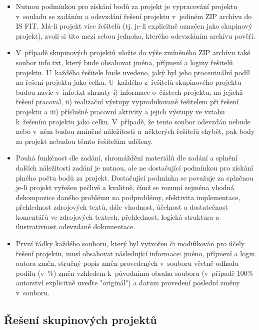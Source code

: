 \documentclass[11pt, a4paper, titlepage]{article}
\begin{document}
\begin{itemize}
    \item Nutnou podmínkou pro získání bodů za projekt je vypracování projektu v~souladu se zadáním a odevzdání řešení projektu v~jediném ZIP archívu do IS FIT. Má-li projekt více řešitelů (tj. je-li explicitně označen jako skupinový projekt), zvolí si tito mezi sebou jednoho, kterého odevzdáním archívu pověří.
    \item V~případě skupinových projektů uložte do výše zmíněného ZIP archívu také soubor info.txt, který bude obsahovat jména, příjmení a loginy řešitelů projektu. U~každého řešitele bude uvedeno, jaký byl jeho procentuální podíl na řešení projektu jako celku. U~každého z~řešitelů skupinového projektu budou navíc v~info.txt shrnuty i) informace o~částech projektu, na jejichž řešení pracoval, ii) realizační výstupy vyprodukované řešitelem při řešení projektu a iii) příslušné pracovní aktivity a jejich výstupy ve vztahu k~řešením projektu jako celku. V~případě, že tento soubor odevzdán nebude nebo v~něm budou zmíněné náležitosti u~některých řešitelů chybět, pak body za projekt nebudou těmto řešitelům uděleny.
    \item Pouhá funkčnost dle zadání, shromáždění materiálů dle zadání a splnění dalších náležitostí zadání je nutnou, ale ne dostačující podmínkou pro získání plného počtu bodů za projekt. Dostačující podmínka se považuje za splněnou je-li projekt vyřešen pečlivě a kvalitně, čímž se rozumí zejména vhodná dekompozice daného problému na podproblémy, efektivita implementace, přehlednost zdrojových textů, dále vhodnost, účelnost a dostatečnost komentářů ve zdrojových textech, přehlednost, logická struktura a ilustrativnost odevzdané dokumentace.
    \item První řádky každého souboru, který byl vytvořen či modifikován pro účely řešení projektu, musí obsahovat následující informace: jméno, příjmení a login autora změn, stručný popis změn provedených v~souboru včetně odhadu podílu (v~\%) změn vzhledem k~původnímu obsahu souboru (v~případě 100\% autorství explicitně uveďte "originál") a datum provedení poslední změny v~souboru.
\end{itemize}


\subsection*{Řešení skupinových projektů}
\end{document}
